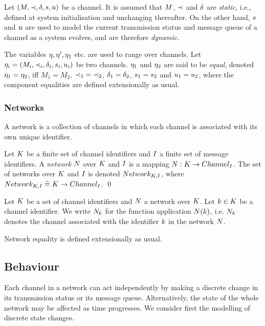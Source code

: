 Let $(\M,\pless,\latency,\ss,\mq)$ be a channel. It is
assumed that $\M$, $\pless$ and $\latency$ are \emph{static}, i.e.,
defined at system initialisation and unchanging thereafter. On the
other hand, $\ss$ and $\mq$ are used to model the current transmission
status and message queue of a channel as a system evolves, and are
therefore \emph{dynamic}.

The variables $\channel, \channel', \channel_1$ etc. are used to range
over channels. Let $\channel_i =
(\M_i, \pless_i, \\ \latency_i, \ss_i, \mq_i)$ be two channels. $\channel_1$
and $\channel_2$ are said to be \emph{equal}, denoted $\channel_1 =
\channel_2$, iff $M_1 = M_2$, $\pless_1\; =\; \pless_2$, $\latency_1 =
\latency_2$, $\ss_1 = \ss_2$ and $\mq_1 = \mq_2$, where the component
equalities are defined extensionally as usual.

\subsubsection{Networks}
A network is a collection of channels in which each channel is associated
with its own unique identifier.

\begin{definition}[Network]
Let $\K$ be a finite set of channel identifiers and $\I$ a finite
set of message identifiers.
A \emph{network} $\N$ over $\K$ and $\I$ is a mapping 
$\N : \K \fun \Channel{\I}$. The set of networks over
$\K$ and $\I$ is denoted $\Network{\K,\I}$, where 
$\Network{\K,\I} \defs \K \fun \Channel{\I}$.
\qed
\end{definition}

\begin{notation}
Let $\K$ be a set of channel identifiers and $\N$ a network over $\K$.
Let $\kk \in \K$ be a channel identifier. We write $\N_\kk$ for the function 
application $\N(\kk)$, i.e. $\N_\kk$ denotes the channel associated with
the identifier $\kk$ in the network $\N$.
\end{notation}
Network equality is defined extensionally as usual.
 
\subsection{Behaviour}\label{ss:bcnetbehaviour}
Each channel in a network can act independently by making a
discrete change in its transmission status or its message
queue. Alternatively, the state of the whole network may be affected
as time progresses. We consider first the modelling of discrete state
changes.

